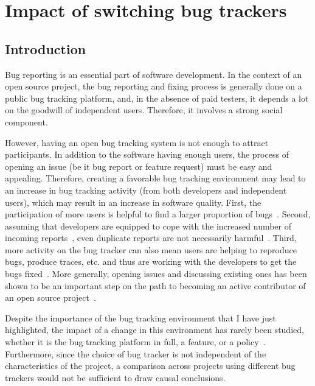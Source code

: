 \chapter{Impact of switching bug trackers}

\label{chap:bug-tracker}

\section{Introduction}

Bug reporting is an essential part of software development.
In the context of an open source project, the bug reporting and fixing process is generally done on a public bug tracking platform, and, in the absence of paid testers, it depends a lot on the goodwill of independent users. Therefore, it involves a strong social component.

However, having an open bug tracking system is not enough to attract participants. In addition to the software having enough users, the process of opening an issue (be it bug report or feature request) must be easy and appealing. Therefore, creating a favorable bug tracking environment may lead to an increase in bug tracking activity (from both developers and independent users), which may result in an increase in software quality. First, the participation of more users is helpful to find a larger proportion of bugs~\cite{raymond1999cathedral,van2009shallow}. Second, assuming that developers are equipped to cope with the increased number of incoming reports~\cite{anvik2005coping, davidson2011coping}, even duplicate reports are not necessarily harmful~\cite{Bettenburg2008}. Third, more activity on the bug tracker can also mean users are helping to reproduce bugs, produce traces, etc. and thus are working with the developers to get the bugs fixed~\cite{breu2010information}. More generally, opening issues and discussing existing ones has been shown to be an important step on the path to becoming an active contributor of an open source project~\cite{jensen2007role, nakakoji2002evolution, ye2003toward}.

Despite the importance of the bug tracking environment that I have just highlighted, the impact of a change in this environment has rarely been studied, whether it is the bug tracking platform in full, a feature, or a policy~\cite{aboukhalil2019bug}.
Furthermore, since the choice of bug tracker is not independent of the characteristics of the project, a comparison across projects using different bug trackers would not be sufficient to draw causal conclusions.

